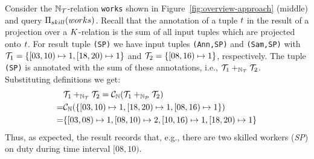 
\begin{exam}\label{ex:interval-sem-storage-and-query-evaluation}
  Consider the ${{\mathbb{N}}}_{\mathcal{T}}$-relation \texttt{works} shown in
  Figure~\ref{fig:overview-approach} (middle) and query
  $\Pi_{skill}(works)$. Recall that the annotation of a tuple $t$
  in the result of a projection over a $K$-relation is the sum of all
  input tuples which are projected onto $t$. For result tuple
  \texttt{(SP)} we have input tuples \texttt{(Ann,SP)} and \texttt{(Sam,SP)} with $\mathcal{T}_1 = \{[03,10) \mapsto 1,
  [18,20) \mapsto 1 \}$ and $\mathcal{T}_{2} =
  \{[08,16) \mapsto 1\}$, respectively. The tuple \texttt{(SP)} is annotated
  with the sum of these annotations, i.e., $\mathcal{T}_1 +_{{{\mathbb{N}}}_{\mathcal{T}}} \mathcal{T}_2$. Substituting
  definitions we get:
  \begin{align*}
    &\mathcal{T}_1 +_{{{\mathbb{N}}}_{\mathcal{T}}} \mathcal{T}_2 = \mathcal{C}_{{{\mathbb{N}}}}(\mathcal{T}_1 +_{{\mathbb{N}}_{\mathcal{P}}} \mathcal{T}_2)\\ = &\mathcal{C}_{{{\mathbb{N}}}}(\{[03,10) \mapsto 1,
  [18,20) \mapsto 1, [08,16) \mapsto 1 \}) \\ = &\{[03,08) \mapsto 1, [08,10) \mapsto 2, [10,16) \mapsto 1, [18,20) \mapsto 1 \}
  \end{align*}
  Thus, as expected, the result records that, e.g., there are two skilled workers (\emph{SP}) on duty during time interval $[08,10)$.
\end{exam}

